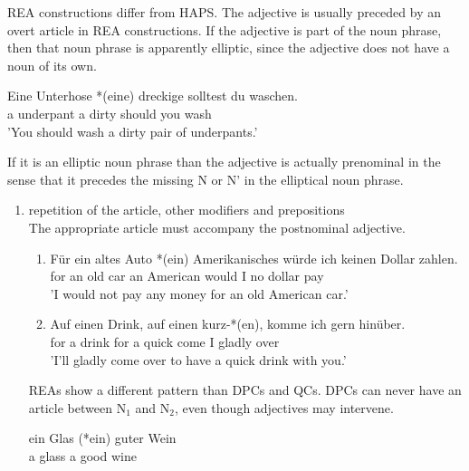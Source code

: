 \documentclass{article}
\begin{document}
REA constructions differ from HAPS. The adjective is usually preceded by an overt article in REA constructions. If the adjective is part of the noun phrase, then that noun phrase is apparently elliptic, since the adjective does not have a noun of its own.
\begin{example}
\label{}
   \gll Eine Unterhose *(eine) dreckige solltest du waschen.\\
a underpant a dirty should you wash\\
'You should wash a dirty pair of underpants.'
   \glt
   \glend
   \end{example}
 
If it is an elliptic noun phrase than the adjective is actually prenominal in the sense that it precedes the missing N or N' in the elliptical noun phrase. 

\begin{enumerate}
\item repetition of the article, other modifiers and prepositions\\ The appropriate article must accompany the postnominal adjective.
\begin{example}
\label{}
\begin{enumerate}
\item  
 \gll F\"ur ein altes Auto *(ein) Amerikanisches w\"urde ich keinen Dollar zahlen.\\
 for an old car an American would I no dollar pay\\
 'I would not pay any money for an old American car.'\\

 \item
  \gll  Auf einen Drink, auf einen kurz-*(en), komme ich gern hin\"uber.\\
for a drink for a quick come I gladly over\\
'I'll gladly come over to have a quick drink with you.' 
   \glt
   \glend
\end{enumerate}
   \end{example}
REAs show a different pattern than DPCs and QCs.
DPCs can never have an article between N$_{1}$ and N$_{2}$, even though adjectives may intervene. 
\begin{example}
\label{}
   \gll ein Glas (*ein) guter Wein\\
a glass a good wine\\

   \glt
   \glend
   \end{example}


\end{enumerate}
\end{document}
